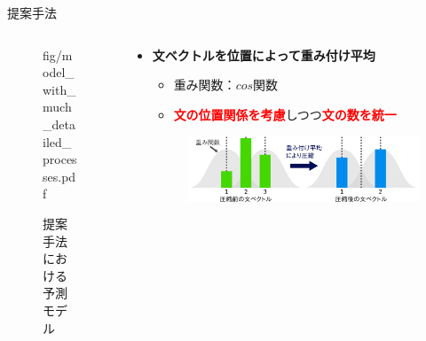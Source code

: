 \documentclass[unicode,10pt]{beamer}
\newlength{\mycolumnwidth}
\newcommand{\arrow}{\textcolor{ttiblue}{\textbf{→}}\hspace{1ex}}
\newcommand{\itemtitle}[1]{\textbf{#1}\\}
\newcommand{\fire}[1]{\textcolor{red}{\textbf{#1}}}
\newcommand{\doublecolumns}[4]{
    \begin{minipage}[t]{#1}
      #2
    \end{minipage}
    \begin{minipage}[t]{#3}
      #4
    \end{minipage}}
\begin{document}
\begin{frame}[t]
\begin{block}{提案手法}
\begin{columns}[onlytextwidth,t]
\begin{column}{\mycolumnwidth}
\begin{figure}
                        {fig/model_with_much_detailed_processes.pdf}
        \caption*{提案手法における予測モデル}
      \end{figure}
    \end{column}

    \begin{column}{\mycolumnwidth}
      \begin{itemize}
        \item \itemtitle{文ベクトルを位置によって重み付け平均}
          \begin{itemize}
            \item 重み関数：$cos$関数
            \item \fire{文の位置関係を考慮}しつつ\fire{文の数を統一}
          \end{itemize}
          \begin{figure}
            \includegraphics[width=\linewidth]
                            {fig/what_are_you_weighting_for.pdf}
          \end{figure}

\end{itemize}
\end{column}
\end{columns}
\end{block}
\end{frame}
\end{document}
